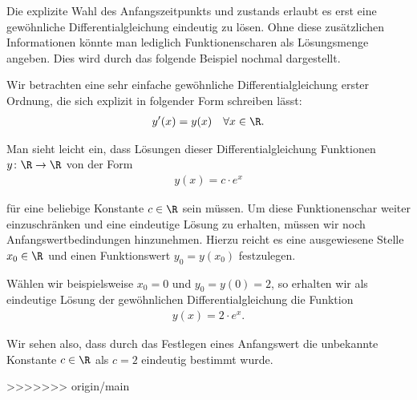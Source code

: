 \documentclass[letterpaper,10pt,english]{jupyterBook}
\begin{document}
\par
Die explizite Wahl des Anfangszeitpunkts und  zustands erlaubt es erst eine gewöhnliche Differentialgleichung eindeutig zu lösen.
Ohne diese zusätzlichen Informationen könnte man lediglich Funktionenscharen als Lösungsmenge angeben.
Dies wird durch das folgende Beispiel nochmal dargestellt.
\label{ode/repetition:example-6}
\begin{example}{}{}



\par
Wir betrachten eine sehr einfache gewöhnliche Differentialgleichung erster Ordnung, die sich explizit in folgender Form schreiben lässt:
\begin{align*}
y'(x) = y(x) \quad \forall x \in \R.
\end{align*}
\par
Man sieht leicht ein, dass Lösungen dieser Differentialgleichung Funktionen \(y \colon \R \rightarrow \R\) von der Form
\begin{align*}
y(x) = c\cdot e^x
\end{align*}
\par
für eine beliebige Konstante \(c \in \R\) sein müssen.
Um diese Funktionenschar weiter einzuschränken und eine eindeutige Lösung zu erhalten, müssen wir noch Anfangswertbedindungen hinzunehmen.
Hierzu reicht es eine ausgewiesene Stelle \(x_0 \in \R\) und einen Funktionswert \(y_0 = y(x_0)\) festzulegen.

\par
Wählen wir beispielsweise \(x_0 = 0\) und \(y_0 = y(0) = 2\), so erhalten wir als eindeutige Lösung der gewöhnlichen Differentialgleichung die Funktion
\begin{align*}
y(x) = 2\cdot e^x.
\end{align*}
\par
Wir sehen also, dass durch das Festlegen eines Anfangswert die unbekannte Konstante \(c \in \R\) als \(c=2\) eindeutig bestimmt wurde.
\end{example}
>>>>>>> origin/main
\end{document}
